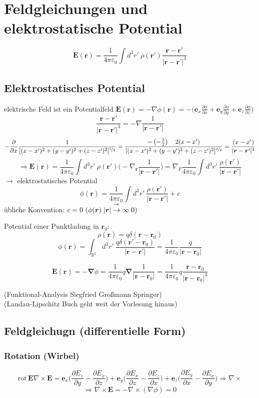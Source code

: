 \documentclass[titlepage,11pt,a4paper,ngerman]{report}
\newcommand{\prt}[2]{\frac{\partial #1}{\partial #2}}
\newcommand{\eofr}{\vec{E}(\vec{r})}
\newcommand{\kq}{\frac{1}{4\pi\epsilon_0}}
\renewcommand{\vec}[1]{\boldsymbol{#1}}
\newcommand{\lcom}[1]{\color{MidnightBlue}#1\color{black}}
\renewcommand{\epsilon}{\varepsilon}
\newcommand{\vabla}{\boldsymbol{\nabla}}
\renewcommand{\paragraph}[1]{\subsubsection{#1}}
\begin{document}
\section{Feldgleichungen und elektrostatische Potential}
$$\vec{E}(\vec{r}) = \kq \int d^3 r'\ \rho(\vec{r}') \frac{\vec{r} - \vec{r}'}{|\vec{r} - \vec{r}'|^3}$$
\subsection{Elektrostatisches Potential}
elektrische Feld ist ein Potentialfeld $\vec{E}(\vec{r}) = - \nabla\phi(\vec{r}) = - \bigg( \vec{e}_x \prt{\phi}{x} + \vec{e}_y \prt{\phi}{y} + \vec{e}_z \prt{\phi}{z}\bigg)$
$$\frac{\vec{r} - \vec{r}'}{|\vec{r} - \vec{r}'|^3} = -\nabla\frac{1}{|\vec{r}-\vec{r}'|}$$
$$-\prt{}{x} \frac{1}{[(x-x')^2 + (y-y')^2 + (z-z')^2]^{\nicefrac{1}{2}}} =  \frac{- \left(-\frac{1}{2}\right) \quad 2(x-x')}{[(x-x')^2 + (y-y')^2 + (z-z')^2]^{\nicefrac{3}{2}}} = \frac{(x-x')}{|\vec{r} - \vec{r}'|^3}$$
$$\Rightarrow \vec{E}(\vec{r}) = \kq \int d^3 r'\ \rho(\vec{r}') \bigg(-\nabla_{\vec{r}} \frac{1}{|\vec{r} - \vec{r}'|} \bigg) = \nabla_F \kq \int d^3 r'\ \frac{\rho(\vec{r}')}{|\vec{r} - \vec{r}'|}$$
$\rightarrow$ elektrostatisches Potential
$$\phi(\vec{r}) = \kq \int d^3 r'\ \frac{\rho(\vec{r}')}{|\vec{r} - \vec{r}'|} + c$$
übliche Konvention: $c = 0\ (\phi(\vec{r})\buildrel{\rightarrow}\over{|\vec{r}| \to \infty} 0)$

Potential einer Punktladung in $\vec{r}_0$:
$$\rho(\vec{r}) = q \delta(\vec{r}-\vec{r}_0)$$
$$\phi(\vec{r}) = \int_{\mathbb R^3} d^3 r'\ \frac{q\delta(\vec{r}' - \vec{r}_0)}{|\vec{r}-\vec{r}'|} = \kq \frac{q}{|\vec{r} - \vec{r}_0|}$$

$$\eofr = - \vabla \phi = \kq q \vabla \frac{1}{|\vec{r} - \vec{r}_0|} = \kq q \frac{\vec{r} - \vec{r}_0}{|\vec{r} - \vec{r}_0|^3}$$


\lcom{(Funktional-Analysis Siegfried Großmann Springer)\\
	(Landau-Lipschitz Buch geht weit der Vorlesung hinaus)}

\subsection{Feldgleichugn (differentielle Form)}

\paragraph{Rotation (Wirbel)}
$$\textrm{rot}\, \vec{E} \nabla \times \vec{E} = \vec{e}_x \bigg(\prt{E_z}{y} - \prt{E_x}{z}\bigg) + \vec{e}_y \bigg(\prt{E_x}{z} - \prt{E_z}{x}\bigg) + \vec{e}_z \bigg(\prt{E_y}{x} - \prt{E_x}{y}\bigg) \Rightarrow \nabla \times$$
$$\Rightarrow \nabla \times \vec{E} = - \nabla \times (\nabla\phi) = 0$$
\end{document}
